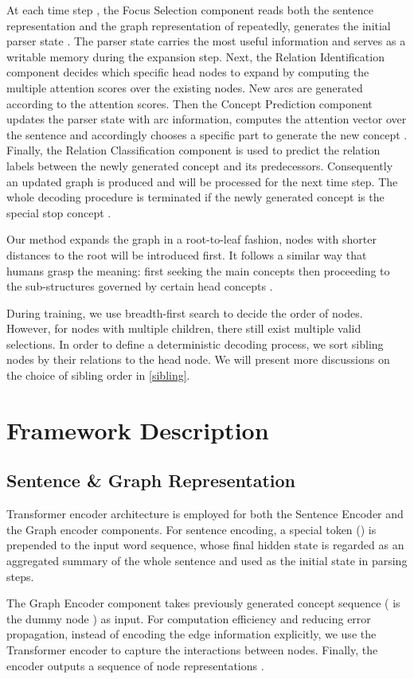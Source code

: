 \documentclass[11pt,a4paper]{article}
\begin{document}
	At each time step , the Focus Selection component reads both the sentence representation  and the graph representation  of  repeatedly, generates the initial parser state . The parser state carries the most useful information and serves as a writable memory during the expansion step. Next, the Relation Identification component decides which specific head nodes to expand by computing the multiple attention scores  over the existing nodes. New arcs are generated according to the attention scores. Then the Concept Prediction component updates the parser state  with arc information, computes the attention vector  over the sentence and accordingly chooses a specific part to generate the new concept . Finally, the Relation Classification component is used to predict the relation labels between the newly generated concept and its predecessors. Consequently an updated graph  is produced and  will be processed for the next time step. The whole decoding procedure is terminated if the newly generated concept is the special stop concept .
	
	Our method expands the graph in a root-to-leaf fashion, nodes with shorter distances to the root will be introduced first. It follows a similar way that humans grasp the meaning: first seeking the main concepts then proceeding to the sub-structures governed by certain head concepts \cite{banarescu2013abstract}.
	
	During training, we use breadth-first search to decide the order of nodes. However, for nodes with multiple children, there still exist multiple valid selections. In order to define a deterministic decoding process, we sort sibling nodes by their relations to the head node. We will present more discussions on the choice of sibling order in \cref{sibling}.
	\section{Framework Description}
	\subsection{Sentence \& Graph Representation}
	Transformer encoder architecture is employed for both the Sentence Encoder and the Graph encoder components. For sentence encoding, a special token () is prepended to the input word sequence, whose final hidden state  is regarded as an aggregated summary of the whole sentence and used as the initial state in parsing steps.
	
	The Graph Encoder component takes previously generated concept sequence  ( is the dummy node ) as input. For computation efficiency and reducing error propagation, instead of encoding the edge information explicitly, we use the Transformer encoder to capture the interactions between nodes. Finally, the encoder outputs a sequence of node representations .
\end{document}
